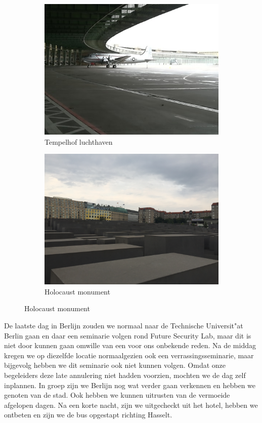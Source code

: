 \begin{figure}[!h]
  \centering
  \begin{subfigure}[h]{0.48\textwidth}
    \centering
    \includegraphics[width=0.85\linewidth]{images/berlijn/tempelhof.jpg}
    \caption{Tempelhof luchthaven}
  \end{subfigure}
  \begin{subfigure}[h]{0.48\textwidth}
    \centering
    \includegraphics[width=0.85\linewidth]{images/berlijn/holocaust_monument.jpg}
    \caption{Holocaust monument}
  \end{subfigure}
\end{figure}

De laatste dag in Berlijn zouden we normaal naar de Technische Universit"at Berlin gaan en daar een seminarie volgen rond Future Security Lab, maar dit is niet door kunnen gaan omwille van een voor ons onbekende reden. Na de middag kregen we op diezelfde locatie normaalgezien ook een verrassingsseminarie, maar bijgevolg hebben we dit seminarie ook niet kunnen volgen. Omdat onze begeleiders deze late annulering niet hadden voorzien, mochten we de dag zelf inplannen. In groep zijn we Berlijn nog wat verder gaan verkennen en hebben we genoten van de stad. Ook hebben we kunnen uitrusten van de vermoeide afgelopen dagen. Na een korte nacht, zijn we uitgecheckt uit het hotel, hebben we ontbeten en zijn we de bus opgestapt richting Hasselt.

